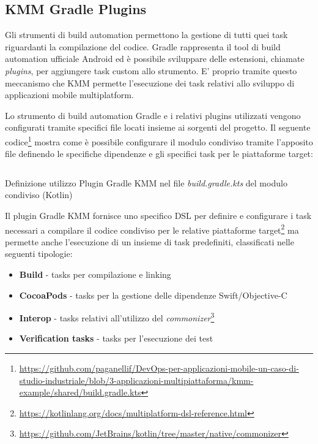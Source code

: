 \subsection{KMM Gradle Plugins}
Gli strumenti di build automation permettono la gestione di tutti quei task riguardanti la compilazione del codice. Gradle rappresenta il tool di build automation ufficiale Android ed è possibile sviluppare delle estensioni, chiamate \textit{plugins}, per aggiungere task custom allo strumento. E' proprio tramite questo meccanismo che KMM permette l'esecuzione dei task relativi allo sviluppo di applicazioni mobile multiplatform.

Lo strumento di build automation Gradle e i relativi plugins utilizzati vengono configurati tramite specifici file locati insieme ai sorgenti del progetto. Il seguente codice\footnote{\href{https://github.com/paganellif/DevOps-per-applicazioni-mobile-un-caso-di-studio-industriale/blob/3-applicazioni-multipiattaforma/kmm-example/shared/build.gradle.kts}{https://github.com/paganellif/DevOps-per-applicazioni-mobile-un-caso-di-studio-industriale/blob/3-applicazioni-multipiattaforma/kmm-example/shared/build.gradle.kts}} mostra come è possibile configurare il modulo condiviso tramite l'apposito file definendo le specifiche dipendenze e gli specifici task per le piattaforme target:

\begin{listing}[H]
\inputminted{kotlin}{code/build.gradle.kts}
\caption{Definizione utilizzo Plugin Gradle KMM nel file \textit{build.gradle.kts} del modulo condiviso (Kotlin)}
\end{listing}

Il plugin Gradle KMM fornisce uno specifico DSL per definire e configurare i task necessari a compilare il codice condiviso per le relative piattaforme target\footnote{\href{https://kotlinlang.org/docs/multiplatform-dsl-reference.html}{https://kotlinlang.org/docs/multiplatform-dsl-reference.html}} ma permette anche l'esecuzione di un insieme di task predefiniti, classificati nelle seguenti tipologie:

\begin{itemize}
    \item \textbf{Build} - tasks per compilazione e linking
    \item \textbf{CocoaPods} - tasks per la gestione delle dipendenze Swift/Objective-C
    \item \textbf{Interop} - tasks relativi all'utilizzo del \textit{commonizer}\footnote{\href{https://github.com/JetBrains/kotlin/tree/master/native/commonizer}{https://github.com/JetBrains/kotlin/tree/master/native/commonizer}}
    \item \textbf{Verification tasks} - tasks per l'esecuzione dei test
\end{itemize}

